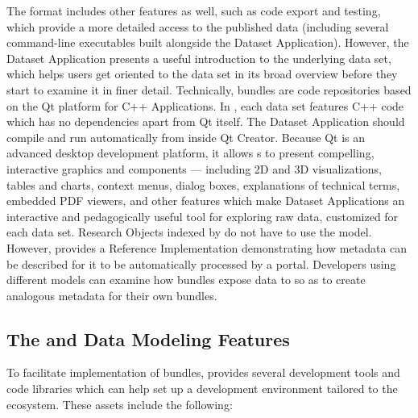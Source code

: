 \documentclass[10pt,letterpaper]{article}
\begin{document}
\p{}
The {\RAK} format includes other 
features as well, such as code export and testing, 
which provide a more detailed access to 
the published data (including several command-line 
executables built alongside the Dataset Application).  
However, the Dataset Application 
presents a useful introduction to the underlying 
data set, which helps users get oriented to the data set 
in its broad overview before they start to examine it in 
finer detail.
\p{}
Technically, {\MOSAIC} {\RAK} bundles are code repositories 
based on the Qt platform for C++ Applications.  
In {\RAK}, each data set features C++ code which has no 
dependencies apart from Qt itself.  The Dataset 
Application should compile and run automatically from 
inside Qt Creator.  Because Qt is an advanced 
desktop {\GUI} development platform, it allows 
{\RO}s to present compelling, 
interactive graphics and {\GUI} components 
--- including 2D and 3D visualizations, tables and charts, 
context menus, dialog boxes, explanations of 
technical terms, embedded PDF viewers, and other 
features which make Dataset Applications an 
interactive and pedagogically useful tool for 
exploring raw data, customized for each data set.
\p{}  
Research Objects indexed by {\MOSAIC} do not have to 
use the {\RAK} model.  However, {\RAK} provides a 
Reference Implementation demonstrating how {\RO} 
metadata can be described for it to be automatically 
processed by a {\MOSAIC} portal.  Developers 
using different {\RO} models can 
examine how {\RAK} bundles expose data to {\MOSAIC} 
so as to create analogous metadata for their own 
bundles.
\p{}
\subsection{The {\lMOSAIC} {\SDK} and Data Modeling Features}
To facilitate implementation of {\RAK} bundles, 
{\MOSAIC} provides several development tools and 
code libraries which can help set up a development 
environment tailored to the {\MOSAIC} ecosystem.  
These assets include the following: 
\end{document}
